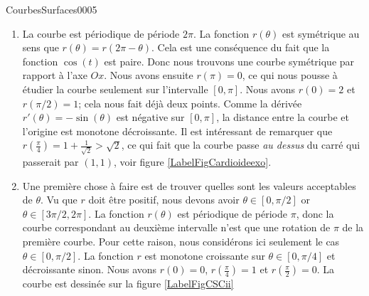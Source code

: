 \begin{corrige}{CourbesSurfaces0005}

	\begin{enumerate}
		\item
			\newcommand{\CaptionFigCardioideexo}{La cardioïde de l'exercice \ref{exoCourbesSurfaces0005}.\ref{CSCi}.}
			
                        La courbe est périodique de période $2\pi$. La fonction $r(\theta)$ est symétrique au sens que $r(\theta)=r(2\pi-\theta)$. Cela est une conséquence du fait que la fonction $\cos(t)$ est paire. Donc nous trouvons une courbe symétrique par rapport à l'axe $Ox$. Nous avons ensuite $r(\pi)=0$, ce qui nous pousse à étudier la courbe seulement sur l'intervalle $[0,\pi]$.
			Nous avons $r(0)=2$ et $r(\pi/2)=1$; cela nous fait déjà deux points. Comme la dérivée $r'(\theta)=-\sin(\theta)$ est négative sur $[0,\pi]$, la distance entre la courbe et l'origine est monotone décroissante. Il est intéressant de remarquer que $r(\frac{ \pi }{ 4 })=1+\frac{1}{ \sqrt{2} }>\sqrt{2}$, ce qui fait que la courbe passe \emph{au dessus} du carré qui passerait par $(1,1)$, voir figure \ref{LabelFigCardioideexo}.

		\item
			Une première chose à faire est de trouver quelles sont les valeurs acceptables de $\theta$. Vu que $r$ doit être positif, nous devons avoir $\theta\in[0,\pi/2]$ or $\theta\in[3\pi/2,2\pi]$. La fonction $r(\theta)$ est périodique de période $\pi$, donc la courbe correspondant au deuxième intervalle n'est que une rotation de $\pi$ de la première courbe. Pour cette raison, nous considérons ici seulement le cas $\theta\in[0,\pi/2]$. La fonction $r$ est monotone croissante sur $\theta\in[0,\pi/4]$ et décroissante sinon. Nous avons $r(0)=0$, $r(\frac{ \pi }{ 4 })=1$ et $r(\frac{ \pi }{2})=0$. La courbe est dessinée sur la figure \ref{LabelFigCSCii}

			\newcommand{\CaptionFigCSCii}{La courbe de l'exercice \ref{exoCourbesSurfaces0005}.\ref{CSCii}.}
			


\end{enumerate}
\end{corrige}
